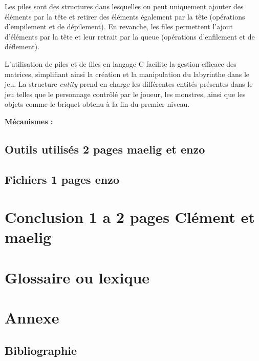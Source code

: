 \documentclass[10pt]{article}
\begin{document}
   Les piles sont des structures dans lesquelles on peut uniquement ajouter des éléments par la tête et retirer des éléments également par la tête 
   (opérations d'empilement et de dépilement). En revanche, les files permettent l'ajout d'éléments par la tête et leur retrait par la queue 
   (opérations d'enfilement et de déflement).

   L'utilisation de piles et de files en langage C facilite la gestion efficace des matrices, simplifiant ainsi la création et la manipulation du 
   labyrinthe dans le jeu. La structure \textit{entity} prend en charge les différentes entités présentes dans le jeu telles que le personnage contrôlé 
   par le joueur, les monstres, ainsi que les objets comme le briquet obtenu à la fin du premier niveau.


   \textbf{Mécanismes :}\\
   \subsection{Outils utilisés 2 pages maelig et enzo}
   \subsection{Fichiers 1 pages enzo}
   
\section{Conclusion 1 a 2 pages Clément et maelig}

\section{Glossaire ou lexique}

\section{Annexe}
   \subsection{Bibliographie}
\end{document}
